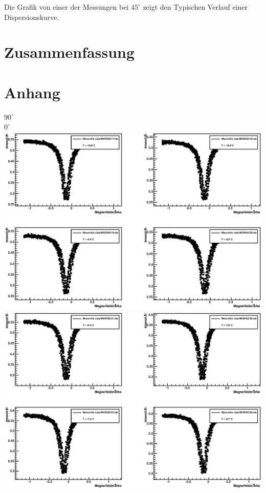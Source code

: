 \documentclass[12pt]{article}
\begin{document}
Die Grafik von einer der Messungen bei $45^\circ$ zeigt den Typischen Verlauf einer Dispersionskurve.






\section{Zusammenfassung}

\section{Anhang}
\singlespacing
\centering
\newpage
\textbf{$90^\circ$} \\

\newpage
\textbf{$0^\circ$} \\

\newpage
\includegraphics[width=1\linewidth]{pictures/1.eps} \\
\includegraphics[width=1\linewidth]{pictures/2.eps} \\
\end{document}

